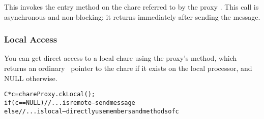 This invokes the entry method  on the chare referred
to by the proxy . This call
is asynchronous and non-blocking; it returns immediately after sending the
message. 


\subsubsection{Local Access}

You can get direct access to a local chare using the
proxy's  method, which returns an ordinary \CC\ pointer
to the chare if it exists on the local processor, and NULL otherwise.

\begin{alltt}
C *c=chareProxy.ckLocal();
if (c==NULL) //...is remote-- send message
else //...is local-- directly use members and methods of c
\end{alltt}

